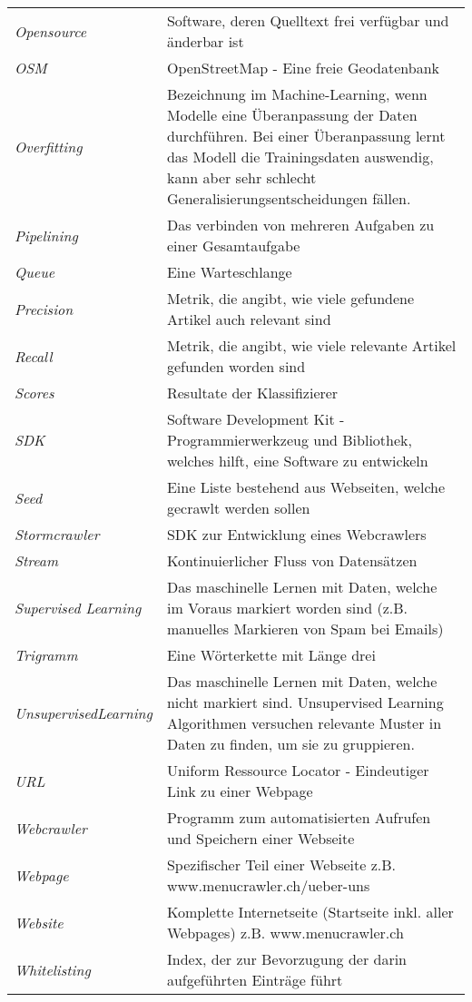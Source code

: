 \begin{table}[H]
	\begin{tabular}{>{\em}p{4cm}p{12cm}}
		Opensource & Software, deren Quelltext frei verfügbar und änderbar ist\\
		OSM & OpenStreetMap - Eine freie Geodatenbank\\
		Overfitting & Bezeichnung im Machine-Learning, wenn Modelle eine Überanpassung der Daten durchführen. Bei einer Überanpassung lernt das Modell die Trainingsdaten auswendig, kann aber sehr schlecht Generalisierungsentscheidungen fällen.\\
		Pipelining & Das verbinden von mehreren Aufgaben zu einer Gesamtaufgabe\\
		Queue & Eine Warteschlange\\
		Precision & Metrik, die angibt, wie viele gefundene Artikel auch relevant sind\\
		Recall & Metrik, die angibt, wie viele relevante Artikel gefunden worden sind\\
		Scores & Resultate der Klassifizierer\\
		SDK & Software Development Kit - Programmierwerkzeug und Bibliothek, welches hilft, eine Software zu entwickeln\\
		Seed & Eine Liste bestehend aus Webseiten, welche gecrawlt werden sollen\\
		Stormcrawler & SDK zur Entwicklung eines Webcrawlers\\
		Stream & Kontinuierlicher Fluss von Datensätzen\\
		Supervised Learning & Das maschinelle Lernen mit Daten, welche im Voraus markiert worden sind (z.B. manuelles Markieren von Spam bei Emails)\\
		Trigramm & Eine Wörterkette mit Länge drei\\
		Unsupervised\newline Learning & Das maschinelle Lernen mit Daten, welche nicht markiert sind. Unsupervised Learning Algorithmen versuchen relevante Muster in Daten zu finden, um sie zu gruppieren.\\
		URL & Uniform Ressource Locator - Eindeutiger Link zu einer Webpage\\
		Webcrawler & Programm zum automatisierten Aufrufen und Speichern einer Webseite\\
		Webpage & Spezifischer Teil einer Webseite z.B. www.menucrawler.ch/ueber-uns\\
		Website & Komplette Internetseite (Startseite inkl. aller Webpages) z.B. www.menucrawler.ch\\
		Whitelisting & Index, der zur Bevorzugung der darin aufgeführten Einträge führt\\	
	\end{tabular}
\end{table}
